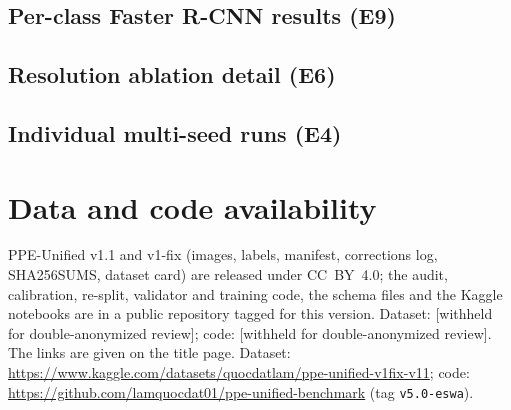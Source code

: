 \documentclass[review,12pt]{elsarticle}
\begin{document}
\subsection{Per-class Faster R-CNN results (E9)}
\label{app:frcnn}

\begin{table}[htbp]\centering
\caption{Faster R-CNN R50-FPN per-class AP@50--95 and operating-point
precision/recall at confidence 0.5, IoU 0.5 (re-trained checkpoint,
E9).}
\label{tab:frcnnpc}
\footnotesize
\setlength{\tabcolsep}{4pt}

\end{table}

\subsection{Resolution ablation detail (E6)}
\label{app:e6}

\begin{table}[htbp]\centering
\caption{YOLO26s trained on the source-C subset at native 416 versus
letterbox-upscaled 640 (15 epochs, seed 42).}
\label{tab:e6detail}
\footnotesize
\setlength{\tabcolsep}{4pt}

\end{table}

\subsection{Individual multi-seed runs (E4)}
\label{app:e4}

\begin{table}[htbp]\centering
\caption{Individual YOLO26s runs on v1 under the identical protocol
(30 epochs).}
\label{tab:e4detail}
\footnotesize

\end{table}

\section*{Data and code availability}
\label{sec:availability}
PPE-Unified v1.1 and v1-fix (images, labels, manifest, corrections
log, SHA256SUMS, dataset card) are released under CC~BY~4.0; the
audit, calibration, re-split, validator and training code, the schema
files and the Kaggle notebooks are in a public repository tagged for
this version.
\ifdefined\ANON
Dataset: [withheld for double-anonymized review]; code: [withheld for
double-anonymized review]. The links are given on the title page.
\else
Dataset: \url{https://www.kaggle.com/datasets/quocdatlam/ppe-unified-v1fix-v11};
code: \url{https://github.com/lamquocdat01/ppe-unified-benchmark}
(tag \texttt{v5.0-eswa}).
\fi
\end{document}
